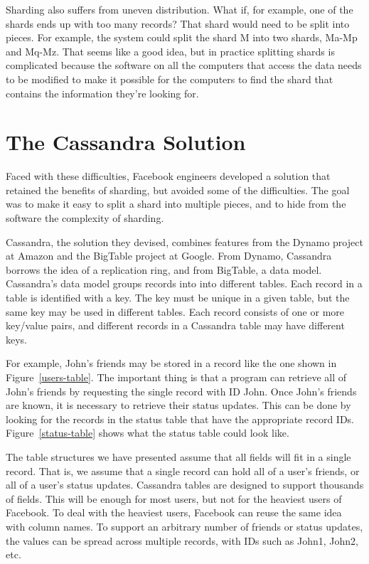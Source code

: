 Sharding also suffers from uneven distribution.
What if, for example, one of the shards ends up with too many records?
That shard would need to be split into pieces.
For example, the system could
split the shard M into two shards, Ma-Mp and Mq-Mz.
That seems like a good idea, but in practice splitting shards
is complicated because the software on all the computers that access the data
needs to be modified to make it possible for the computers
to find the shard that contains the information they're looking for.

\section{The Cassandra Solution}

Faced with these difficulties, Facebook engineers developed a solution that
retained the benefits of sharding, but avoided some of the difficulties.
The goal was to make it easy to split a shard into multiple pieces,
and to hide from the software the complexity of sharding.

Cassandra, the solution they devised, combines features
from the Dynamo project at Amazon and the BigTable project at Google.
From Dynamo, Cassandra borrows the idea of a replication ring,
and from BigTable, a data model.
Cassandra's data model groups records into into different tables.
Each record in a table is identified with a key.
The key must be unique in a given table,
but the same key may be used in different tables.
Each record consists of one or more key/value pairs, and
different records in a Cassandra table may have different keys.

For example, John's friends may be stored in a record like the one shown in Figure~\ref{users-table}.
The important thing is that a program can retrieve
all of John's friends by requesting the single record with ID John.
Once John's friends are known, it is necessary to retrieve their status updates.
This can be done by looking for the records in the status table that have the appropriate record IDs.
Figure~\ref{status-table} shows what the status table could look like.

The table structures we have presented assume that all fields will fit in a single record.
That is, we assume that a single record can hold all of a user's friends, or all of a user's status updates.
Cassandra tables are designed to support thousands of fields.
This will be enough for most users, but not for the heaviest users of Facebook.
To deal with the heaviest users, Facebook can reuse the same idea with column names.
To support an arbitrary number of friends or status updates,
the values can be spread across multiple records, with IDs such as John1, John2, etc.

